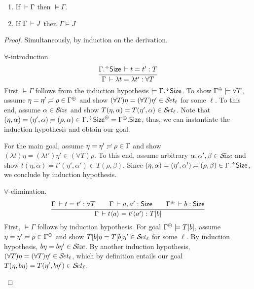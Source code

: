 \documentclass[acmlarge,review,anonymous]{acmart}\settopmatter{printfolios=true}
\begin{document}
\begin{theorem}
  \label{thm:fund}
  \bla
  \begin{enumerate}
  \item
  If $\der \Gamma$ then $\models \Gamma$.
  \item
  If $\Gamma \der J$ then %
  $\Gamma \models J$
  \end{enumerate}
\end{theorem}
\begin{proof}
Simultaneously, by induction on the derivation.

\begin{caselist}
\nextcase $\forall$-introduction.
\[
  \ru{\erext \Gamma \Size \der t = t' : T
    }{\Gamma \der \lambda t = \lambda t' : \forall T}
\]
First $\models \Gamma$ follows from the induction hypothesis $\models {\erext \Gamma \Size}$.
To show $\resurrect\Gamma \models \forall T$,
assume $\eta = \eta' \eeq \rho \in \resurrect \Gamma$
and show $(\forall T)\eta = (\forall T)\eta' \in \SET[\ell]$ for some $\ell$.
To this end, assume $\alpha \in \SIZE$ and show $T(\eta,\alpha) = T(\eta',\alpha) \in \SET[\ell]$.
Note that $(\eta,\alpha) = (\eta',\alpha) \eeq (\rho,\alpha) \in
\resurrect {\erext \Gamma \Size} = \cext {\resurrect\Gamma}\Size$,
thus, we can instantiate the induction hypothesis and obtain our goal.

For the main goal,
assume $\eta = \eta' \eeq \rho \in \Gamma$ and
show $(\lambda t)\eta = (\lambda t')\eta' \in (\forall T)\rho$.
To this end, assume arbitrary $\alpha,\alpha',\beta \in \SIZE$ and show
$t(\eta,\alpha) = t'(\eta',\alpha') \in T(\rho,\beta)$.
Since $(\eta,\alpha) = (\eta',\alpha') \eeq (\rho,\beta) \in \erext \Gamma \Size$,
we conclude by induction hypothesis.

\nextcase $\forall$-elimination.
\[
  \ru{\Gamma \der t = t' : \forall T \qquad
      \Gamma \der a, a' : \Size \qquad
      \resurrect\Gamma \der b : \Size
    }{\Gamma \der t \ann a = t' \ann {a'} : T[b]}
\]
First, $\models \Gamma$ follows by induction hypothesis.
For goal $\resurrect \Gamma \models T[b]$,
assume $\eta = \eta' \eeq \rho \in \resurrect\Gamma$ and show
$T[b]\eta = T[b]\eta' \in \SET[\ell]$ for some $\ell$.
By induction hypothesis,  $b\eta = b\eta' \in \SIZE$.
By another induction hypothesis, $(\forall T)\eta = (\forall T)\eta' \in \SET[\ell]$,
which by definition entails our goal $T(\eta, b\eta) = T(\eta', b\eta') \in \SET[\ell]$.



\end{caselist}
\end{proof}
\end{document}

